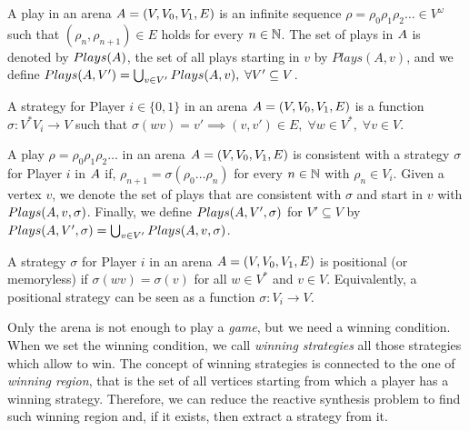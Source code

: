 \begin{definition}
A play in an arena $A = \left( V, V_0, V_1, E \right)$ is an infinite sequence $\rho=\rho_0\rho_1\rho_2\dots \in V^\omega$ such that $(\rho_n,\rho_{n+1}) \in E$ holds for every $n \in \mathbb{N}$. 
The set of plays in $A$ is denoted by $Plays(A)$, the set of all plays starting in $v$ by $Plays(A,v)$, and we define $Plays(A,V')=\bigcup_{v\in V'} Plays(A,v), \; \forall V' \subseteq V$.
\end{definition}

\begin{definition}
A strategy for Player $i \in \{0,1\}$ in an arena $A = \left( V,V_0,V_1,E \right)$ is a function $\sigma \colon V^*V_i \to V$ such that $\sigma(wv)=v' \implies (v,v') \in E,\; \forall w \in V^*,\; \forall v \in V$. 
\end{definition}

\begin{definition}
A play $\rho = \rho_0\rho_1\rho_2\dots$ in an arena $A=\left( V,V_0,V_1,E \right)$ is consistent with a strategy $\sigma$ for Player $i$ in $A$ if, $\rho_{n+1} = \sigma(\rho_0\dots\rho_n)$ for every $n \in \mathbb{N}$ with $\rho_n \in V_i$. 
Given a vertex $v$, we denote the set of plays that are consistent with $\sigma$ and start in $v$ with $Plays(A, v, \sigma)$. 
Finally, we define $Plays(A, V', \sigma)$ for $V'\subseteq V$ by $Plays(A, V', \sigma) = \bigcup_{v \in V'} Plays(A, v, \sigma)$.
\end{definition}

\begin{definition}
A strategy $\sigma$ for Player $i$ in an arena $A=(V,V_0,V_1,E)$ is positional (or memoryless) if $\sigma(wv)=\sigma(v)$ for all $w \in V^*$ and $v \in V$. 
Equivalently, a positional strategy can be seen as a function $\sigma \colon V_i \to V$.
\end{definition}

Only the arena is not enough to play a \textit{game}, but we need a winning condition.
When we set the winning condition, we call \textit{winning strategies} all those strategies which allow to win. 
The concept of winning strategies is connected to the one of \textit{winning region}, that is the set of all vertices starting from which a player has a winning strategy.
Therefore, we can reduce the reactive synthesis problem to find such winning region and, if it exists, then extract a strategy from it.

